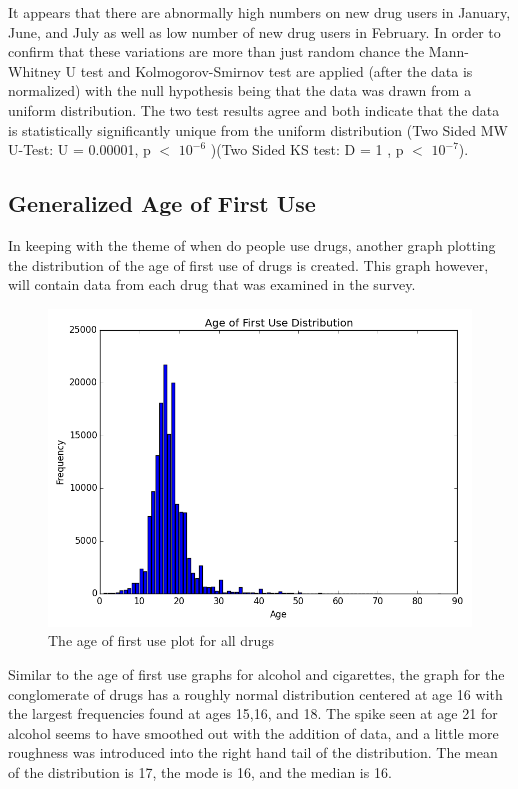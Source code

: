 \documentclass[a4 paper]{article}
\begin{document}
It appears that there are abnormally high numbers on new drug users in January, June, and July as well as low number of new drug users in February. In order to confirm that these variations are more than just random chance the Mann-Whitney U test and Kolmogorov-Smirnov test are applied (after the data is normalized) with the null hypothesis being that the data was drawn from a uniform distribution. The two test results agree and both indicate that the data is statistically significantly unique from the uniform distribution (Two Sided MW U-Test: U = 0.00001, p $<$ $10^{-6}$ )(Two Sided KS test: D = 1 , p $<$ $10^{-7}$).\\

\subsection*{Generalized Age of First Use}
In keeping with the theme of when do people use drugs, another graph plotting the distribution of the age of first use of drugs is created. This graph however, will contain data from each drug that was examined in the survey.

\begin{figure}[H]
	\centering
	\includegraphics[width=5in]{images/afu}
	\caption{The age of first use plot for all drugs}
\end{figure}

Similar to the age of first use graphs for alcohol and cigarettes, the graph for the conglomerate of drugs has a roughly normal distribution centered at age 16 with the largest frequencies found at ages 15,16, and 18. The spike seen at age 21 for alcohol seems to have smoothed out with the addition of data, and a little more roughness was introduced into the right hand tail of the distribution. The mean of the distribution is 17, the mode is 16, and the median is 16.\\
\end{document}
